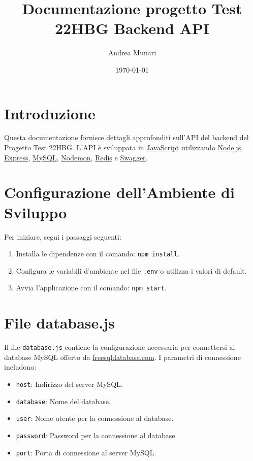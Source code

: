 \documentclass{article}
\title{Documentazione progetto Test 22HBG Backend API}
\author{Andrea Munari}
\date{\today}
\begin{document}
\maketitle

\section{Introduzione}
Questa documentazione fornisce dettagli approfonditi sull'API del backend del Progetto Test 22HBG. L'API è sviluppata in \href{https://www.javascript.com/}{JavaScript} utilizzando \href{https://nodejs.org/en}{Node.js}, \href{https://www.npmjs.com/package/express}{Express}, \href{https://www.npmjs.com/package/mysql}{MySQL}, \href{https://www.npmjs.com/package/nodemon}{Nodemon}, \href{https://www.npmjs.com/package/redis}{Redis} e \href{https://www.npmjs.com/package/swagger}{Swagger}.

\section{Configurazione dell'Ambiente di Sviluppo}
Per iniziare, segui i passaggi seguenti:

\begin{enumerate}
    \item Installa le dipendenze con il comando: \texttt{npm install}.
    \item Configura le variabili d'ambiente nel file \texttt{.env} o utilizza i valori di default.
    \item Avvia l'applicazione con il comando: \texttt{npm start}.
\end{enumerate}


\section{File database.js}
Il file \texttt{database.js} contiene la configurazione necessaria per connettersi al database MySQL offerto da \href{https://www.freesqldatabase.com/}{freesqldatabase.com}.
\linebreak
I parametri di connessione includono:

\begin{itemize}
    \item \texttt{host}: Indirizzo del server MySQL.
    \item \texttt{database}: Nome del database.
    \item \texttt{user}: Nome utente per la connessione al database.
    \item \texttt{password}: Password per la connessione al database.
    \item \texttt{port}: Porta di connessione al server MySQL.
\end{itemize}
\end{document}
